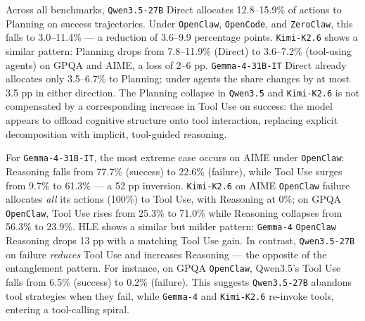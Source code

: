 Across all benchmarks, \texttt{Qwen3.5-27B} Direct allocates 12.8--15.9\% of actions to Planning on success trajectories. Under \texttt{OpenClaw}, \texttt{OpenCode}, and \texttt{ZeroClaw}, this falls to 3.0--11.4\% — a reduction of 3.6--9.9 percentage points.
\texttt{Kimi-K2.6} shows a similar pattern: Planning drops from 7.8--11.9\% (Direct) to 3.6--7.2\% (tool-using agents) on GPQA and AIME, a loss of 2--6 pp.
\texttt{Gemma-4-31B-IT} Direct already allocates only 3.5--6.7\% to Planning; under agents the share changes by at most 3.5 pp in either direction.
%
The Planning collapse in \texttt{Qwen3.5} and \texttt{Kimi-K2.6} is not compensated by a corresponding increase in Tool Use on success: the model appears to offload cognitive structure onto tool interaction, replacing explicit decomposition with implicit, tool-guided reasoning.


For \texttt{Gemma-4-31B-IT}, the most extreme case occurs on AIME under \texttt{OpenClaw}: Reasoning falls from 77.7\% (success) to 22.6\% (failure), while Tool Use surges from 9.7\% to 61.3\% — a 52 pp inversion.
\texttt{Kimi-K2.6} on AIME \texttt{OpenClaw} failure allocates \emph{all} its actions (100\%) to Tool Use, with Reasoning at 0\%; on GPQA \texttt{OpenClaw}, Tool Use rises from 25.3\% to 71.0\% while Reasoning collapses from 56.3\% to 23.9\%.
HLE shows a similar but milder pattern: \texttt{Gemma-4} \texttt{OpenClaw} Reasoning drops 13 pp with a matching Tool Use gain.
%
In contrast, \texttt{Qwen3.5-27B} on failure \emph{reduces} Tool Use and increases Reasoning — the opposite of the entanglement pattern. For instance, on GPQA \texttt{OpenClaw}, Qwen3.5's Tool Use falls from 6.5\% (success) to 0.2\% (failure). This suggests \texttt{Qwen3.5-27B} abandons tool strategies when they fail, while \texttt{Gemma-4} and \texttt{Kimi-K2.6} re-invoke tools, entering a tool-calling spiral.


